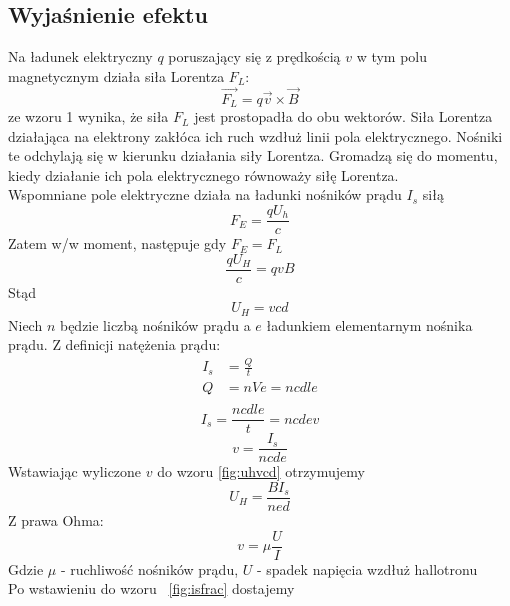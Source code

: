 \documentclass[10pt,a4paper]{article}
\begin{document}
\subsection{Wyjaśnienie efektu }
Na ładunek elektryczny $q$ poruszający się z prędkością $v$ w tym polu magnetycznym działa siła Lorentza $F_L$:
\begin{equation}
\vec{F_L} = q\vec{v}\times \vec{B}
\end{equation}
ze wzoru 1 wynika, że siła $F_L$ jest prostopadła do obu wektorów. Siła Lorentza działająca na elektrony zakłóca ich ruch wzdłuż linii pola elektrycznego. Nośniki te odchylają się w kierunku działania siły Lorentza. Gromadzą się do momentu, kiedy działanie ich pola elektrycznego równoważy siłę Lorentza.\\
Wspomniane pole elektryczne działa na ładunki nośników prądu $I_s$ siłą 
\begin{equation}
F_E = \frac{qU_h}{c}
\end{equation}
Zatem w/w moment, następuje gdy $F_E=F_L$
\begin{equation}
\frac{qU_H}{c} = qvB
\end{equation}
Stąd
\begin{equation}
\label{fig:uhvcd}
U_H = vcd
\end{equation} 
Niech $n$ będzie liczbą nośników prądu a $e$ ładunkiem elementarnym nośnika prądu. Z definicji natężenia prądu:
\begin{equation}
\begin{split}
I_s & =\frac{Q}{t}\\
Q & = nVe = ncdle\\
\end{split}
\end{equation} 
\begin{equation}
\label{fig:isfrac}
I_s  = \frac{ncdle}{t} = ncdev
\end{equation} 
\begin{equation}
v  = \frac{I_s}{ncde}
\end{equation} 
Wstawiając wyliczone $v$ do wzoru \ref{fig:uhvcd} otrzymujemy
\begin{equation}
\label{fig:uhbis}
U_H = \frac{BI_s}{ned}
\end{equation} 
Z prawa Ohma: 
\begin{equation}
v = \mu \frac{U}{I}
\end{equation} 
Gdzie $\mu$ - ruchliwość nośników prądu, $U$ - spadek napięcia wzdłuż hallotronu\\
Po wstawieniu do wzoru ~\ref{fig:isfrac} dostajemy
\end{document}
